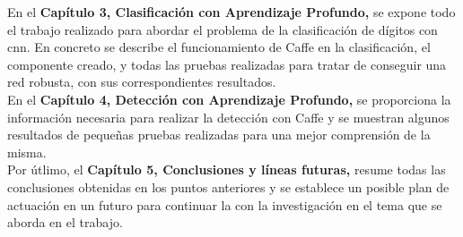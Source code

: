 En el \textbf{Capítulo 3, Clasificación con Aprendizaje Profundo,} se expone todo el trabajo realizado para abordar el problema de la clasificación de dígitos con \acrshort{cnn}. En concreto se describe el funcionamiento de Caffe en la clasificación, el componente creado, y todas las pruebas realizadas para tratar de conseguir una red robusta, con sus correspondientes resultados.\\

En el \textbf{Capítulo 4, Detección con Aprendizaje Profundo,}  se proporciona la información necesaria para realizar la detección con Caffe y se muestran algunos resultados de pequeñas pruebas realizadas para una mejor comprensión de la misma.\\

Por útlimo, el \textbf{Capítulo 5, Conclusiones y líneas futuras,} resume todas las conclusiones obtenidas en los puntos anteriores y se establece un posible plan de actuación en un futuro para continuar la con la investigación en el tema que se aborda en el trabajo.
